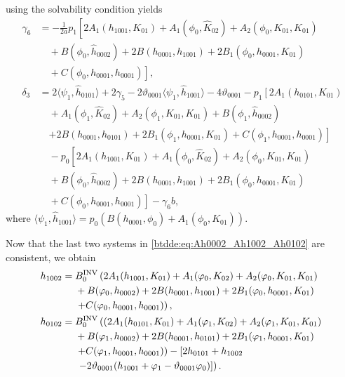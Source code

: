 using the solvability condition yields
\begin{equation*}
\begin{aligned}
\gamma_6 &= -\frac1{2a} p_1 \left[ 2A_1(h_{1001},K_{01}) +
				A_1(\phi_0,\hat K_{02}) + A_2(\phi_0,K_{01},K_{01}) \right. \\
	        & \quad + B(\phi_0,\hat h_{0002}) + 2B(h_{0001},h_{1001}) + 2B_1(\phi_0,h_{0001},K_{01}) \\
            & \left. \quad + C(\phi_0,h_{0001},h_{0001}) \right],  \\
\delta_3 &= 2 \langle \psi_1, \hat h_{0101} \rangle + 2 \gamma_5 - 2\vartheta_{0001} \langle \psi_1, \hat h_{1001} \rangle 
                - 4\vartheta_{0001} -p_1 \left[ 2A_1(h_{0101},K_{01}) \right. \\ 
            & \quad + A_1(\phi_1,\hat K_{02}) + A_2(\phi_1,K_{01},K_{01}) + B(\phi_1,\hat h_{0002}) \\
            & \quad \left. + 2B(h_{0001},h_{0101}) + 2B_1(\phi_1,h_{0001},K_{01}) +  C(\phi_1,h_{0001},h_{0001}) \right] \\
            & \quad - p_0 \left[ 2A_1(h_{1001},K_{01}) + A_1(\phi_0,\hat K_{02}) +
            A_2(\phi_0,K_{01},K_{01}) \right. \\ 
            & \quad + B(\phi_0,\hat h_{0002}) + 2B(h_{0001},h_{1001}) + 2B_1(\phi_0,h_{0001},K_{01}) \\
            & \left. \quad + C(\phi_0,h_{0001},h_{0001}) \right] - \gamma_6 b,
\end{aligned}
\end{equation*}
where $\langle \psi_1, \hat h_{1001} \rangle = p_0 \left( B(h_{0001},\phi_0) + A_1(\phi_0,K_{01}) \right)$.

Now that the last two systems in \cref{btdde:eq:Ah0002_Ah1002_Ah0102} are consistent,
we obtain
\begin{equation*}
\begin{aligned}
h_{1002} ={}& B^{\mathrm{INV}}_{0} \left( 2A_1(h_{1001},K_{01}) + A_1(\varphi_0,K_{02}) + A_2(\varphi_0,K_{01},K_{01}) \right.
					 \\ & + B(\varphi_0,h_{0002}) + 2B(h_{0001},h_{1001}) +
					 2B_1(\varphi_0,h_{0001},K_{01}) \\
  & \left. + C(\varphi_0,h_{0001},h_{0001}) \right), \\
h_{0102} ={}& B^{\mathrm{INV}}_{0} \left(\left( 2A_1(h_{0101},K_{01}) + A_1(\varphi_1,K_{02}) + A_2(\varphi_1,K_{01},K_{01}) \right.\right. \\
  & + B(\varphi_1,h_{0002}) + 2B(h_{0001},h_{0101}) + 2B_1(\varphi_1,h_{0001},K_{01}) \\
  & \left. + C(\varphi_1,h_{0001},h_{0001})\right) - \left[ 2h_{0101} + h_{1002} \right. \\
  & \left.\left. -2\vartheta_{0001} (h_{1001} + \varphi_1 - \vartheta_{0001}\varphi_0) \right]\right).
\end{aligned}
\end{equation*}

